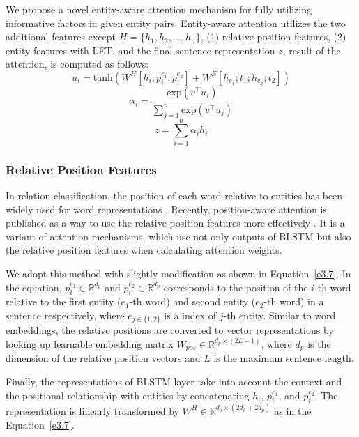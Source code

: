 \documentclass[twoside,leqno,twocolumn]{article}
\begin{document}
We propose a novel entity-aware attention mechanism for fully utilizing informative factors in given entity pairs. Entity-aware attention utilizes the two additional features except $H=\{h_1, h_2, ..., h_n\}$, (1) relative position features, (2) entity features with LET, and the final sentence representation $z$, result of the attention, is computed as follows:
\begin{equation} 
u_i=\text{tanh}(W^H[h_i;p_{i}^{e_1};p_{i}^{e_2}]+W^E[h_{e_1};t_1;h_{e_2};t_2])
\label{e3.7}
\end{equation}
\begin{equation} 
\alpha_i=\frac{\text{exp}(v^{\top}u_i)}{\sum_{j=1}^{n}\text{exp}(v^{\top}u_j)}
\label{e3.8}
\end{equation}
\begin{equation} 
z=\sum_{i=1}^{n} \alpha_i h_i
\label{e3.9}
\end{equation}



\subsubsection{Relative Position Features}
In relation classification, the position of each word relative to entities has been widely used for word representations \cite{zeng2014relation, nguyen2015relation, huang2016attention}.
Recently, position-aware attention is published as a way to use the relative position features more effectively \cite{zhang2017position}.
It is a variant of attention mechanisms, which use not only outputs of BLSTM but also the relative position features when calculating attention weights.

We adopt this method with slightly modification as shown in Equation~\ref{e3.7}.
In the equation, $p_i^{e_1}\in \mathbb{R}^{d_p}$ and $p_i^{e_2}\in \mathbb{R}^{d_p}$ corresponds to the position of the $i$-th word relative to the first entity ($e_1$-th word) and second entity ($e_2$-th word) in a sentence respectively, where $e_{j\in\{1,2\}}$ is a index of $j$-th entity.
Similar to word embeddings, the relative positions are converted to vector representations by looking up learnable embedding matrix $W_{pos}\in \mathbb{R}^{d_p\times (2L-1)}$, where $d_p$ is the dimension of the relative position vectors and $L$ is the maximum sentence length.

Finally, the representations of BLSTM layer take into account the context and the positional relationship with entities by concatenating $h_i$, $p_i^{e_1}$, and $p_i^{e_2}$.
The representation is linearly transformed by $W^H\in \mathbb{R}^{d_a\times (2d_h+2d_p)}$ as in the Equation~\ref{e3.7}.
\end{document}
